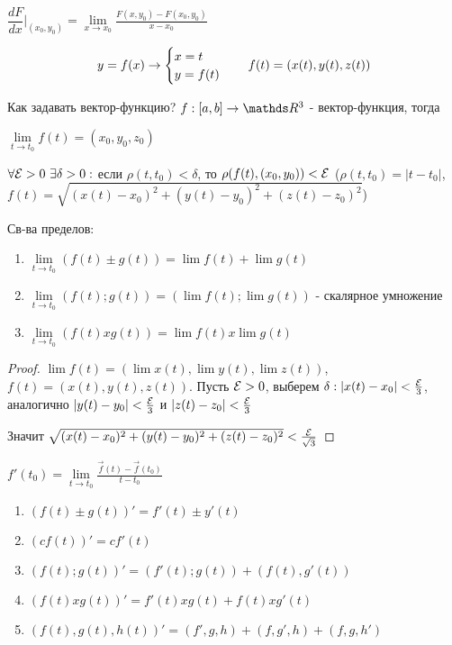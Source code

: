 \documentclass[12pt, fleqn]{article}
\begin{document}
\begin{reminder} \ \\
    $\dfrac{dF}{dx}|_{(x_0,y_0)}=\lim\limits_{x \rightarrow x_0} \frac{F(x,y_0)-F(x_0,y_0)}{x-x_0}$
\end{reminder}

\[y=f(x) \rightarrow \begin{cases} x=t\\ y=f(t) \end{cases}\quad f(t)=(x(t),y(t),z(t))\]

Как задавать вектор-функцию? $f:[a,b] \rightarrow \R^3$ - вектор-функция, тогда 

$\lim\limits_{t \rightarrow t_0} f(t) = (x_0, y_0, z_0)$

$\forall \mathcal{E}>0\ \exists \delta>0:$ если $\rho (t,t_0) < \delta$, то $\rho(f(t),(x_0,y_0))<\mathcal{E}$ ($\rho (t,t_0) = |t-t_0|$, $f(t)=\sqrt{(x(t)-x_0)^2+(y(t)-y_0)^2+(z(t)-z_0)^2}$)

Св-ва пределов:
\begin{enumerate}
    \item $\lim\limits_{t \rightarrow t_0} (f(t) \pm g(t)) = \lim f(t) + \lim g(t)$
    \item $\lim\limits_{t \rightarrow t_0} (f(t);g(t)) = (\lim f(t); \lim g(t))$ - скалярное умножение
    \item $\lim\limits_{t \rightarrow t_0} (f(t) x g(t)) = \lim f(t) x \lim g(t)$
\end{enumerate}

\begin{proof}
    $\lim f(t)=(\lim x(t), \lim y(t), \lim z(t))$, $f(t)=(x(t), y(t), z(t))$. Пусть $\mathcal{E}>0$, выберем $\delta: |x(t)-x_0|< \frac{\mathcal{E}}{3}$, аналогично $|y(t)-y_0|<\frac{\mathcal{E}}{3}$ и $|z(t)-z_0|<\frac{\mathcal{E}}{3}$
    
    Значит $\sqrt{(x(t)-x_0)^2+(y(t)-y_0)^2+(z(t)-z_0)^2} < \frac{\mathcal{E}}{\sqrt{3}}$
\end{proof}

\begin{definition}
    $f'(t_0)=\lim\limits_{t \rightarrow t_0} \frac{\overrightarrow{f}(t)-\overrightarrow{f}(t_0)}{t-t_0}$
\end{definition}

\begin{properties}{}
    \begin{enumerate}
        \item $(f(t)\pm g(t))'=f'(t)\pm y'(t)$
        \item $(c f(t))'=c f'(t)$
        \item $(f(t);g(t))'=(f'(t);g(t))+(f(t),g'(t))$
        \item $(f(t) x g(t))' = f'(t) x g(t) + f(t) x g'(t)$
        \item $(f(t),g(t),h(t))'=(f',g,h)+(f,g',h)+(f,g,h')$
    \end{enumerate}
\end{properties}
\end{document}
